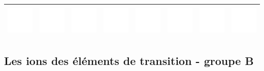 \documentclass[
  11pt,
  french,
  a4paper,
  openany]{book}
\begin{document}
\begin{longtable}[]{@{}cccccccc@{}}
\includegraphics[width=\textwidth,height=4em]{images/1px.png} & \includegraphics[width=\textwidth,height=4em]{images/1px.png} & \includegraphics[width=\textwidth,height=4em]{images/1px.png} & \includegraphics[width=\textwidth,height=4em]{images/1px.png} & \includegraphics[width=\textwidth,height=4em]{images/1px.png} & \includegraphics[width=\textwidth,height=4em]{images/1px.png} & \includegraphics[width=\textwidth,height=4em]{images/1px.png} & \includegraphics[width=\textwidth,height=4em]{images/1px.png}\tabularnewline
\bottomrule
\end{longtable}

\hypertarget{les-ions-des-uxe9luxe9ments-de-transition---groupe-b}{%
\subsection{Les ions des éléments de transition - groupe B}\label{les-ions-des-uxe9luxe9ments-de-transition---groupe-b}}
\end{document}
